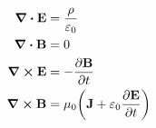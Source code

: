\begin{align}
    \div{\vb{E}} &= \frac{\rho}{\varepsilon_0} \\
    \div{\vb{B}} &= 0 \\
    \curl{\vb{E}} &= -\pdv{\vb{B}}{t}\\
    \label{eq:DisplayMath}\curl{\vb{B}} &= \mu_0\qty(\vb{J} + \varepsilon_0 \pdv{\vb{E}}{t})
\end{align}